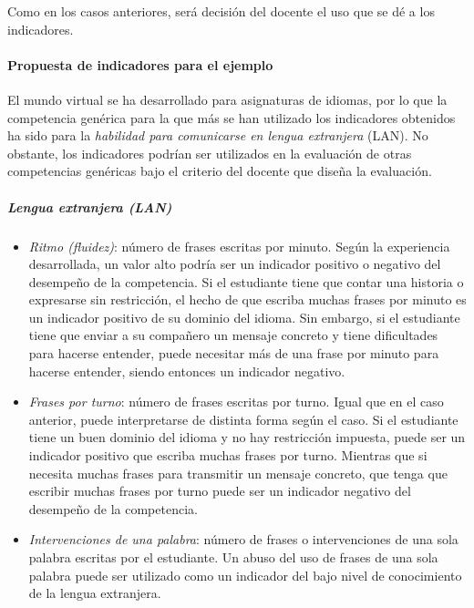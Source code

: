 			Como en los casos anteriores, será decisión del docente el uso que se dé a los indicadores.

			\paragraph*{Propuesta de indicadores para el ejemplo}

			El mundo virtual se ha desarrollado para asignaturas de idiomas, por lo que la competencia genérica para la que más se han utilizado los indicadores obtenidos ha sido para la \emph{habilidad para comunicarse en lengua extranjera} (LAN). No obstante, los indicadores podrían ser utilizados en la evaluación de otras competencias genéricas bajo el criterio del docente que diseña la evaluación.


			\subparagraph*{Lengua extranjera (LAN)}
\begin{itemize}
\item \emph{Ritmo (fluidez)}: número de frases escritas por minuto. Según la experiencia desarrollada, un valor alto podría ser un indicador positivo o negativo del desempeño de la competencia. Si el estudiante tiene que contar una historia o expresarse sin restricción, el hecho de que escriba muchas frases por minuto es un indicador positivo de su dominio del idioma. Sin embargo, si el estudiante tiene que enviar a su compañero un mensaje concreto y tiene dificultades  para hacerse entender, puede necesitar más de una frase por minuto para hacerse entender, siendo entonces un indicador negativo.
\item \emph{Frases por turno}: número de frases escritas por turno. Igual que en el caso anterior, puede interpretarse de distinta forma según el caso. Si el estudiante tiene un buen dominio del idioma y no hay restricción impuesta, puede ser un indicador positivo que escriba muchas frases por turno. Mientras que si necesita muchas frases para transmitir un mensaje concreto, que tenga que escribir muchas frases por turno puede ser un indicador negativo del desempeño de la competencia.
\item \emph{Intervenciones de una palabra}: número de frases o intervenciones de una sola palabra escritas por el estudiante. Un abuso del uso de frases de una sola palabra puede ser utilizado como un indicador del bajo nivel de conocimiento de la lengua extranjera.
\end{itemize}

